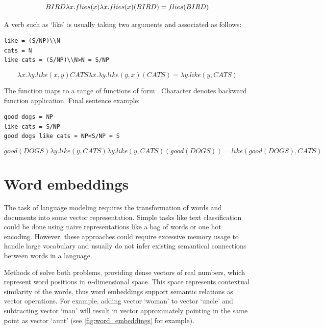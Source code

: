 \[ 
BIRD \\
\lambda x.flies(x)\\
\lambda x.flies(x)(BIRD)=flies(BIRD)
\]

A verb such as ‘like’ is usually taking two arguments and associated as follows:

\begin{verbatim}
like = (S/NP)\\N
cats = N
like cats = (S/NP)\\N>N = S/NP
\end{verbatim}

\[ 
\lambda x.\lambda y.like(x, y)
CATS
\lambda x.\lambda y.like(y, x)(CATS)=\lambda y.like(y, CATS)
\]

The function  maps  to a range of functions of form .  Character \code{<} denotes backward function application. Final sentence example:

\begin{verbatim}
good dogs = NP
like cats = S/NP
good dogs like cats = NP<S/NP = S
\end{verbatim}

\[ 
good(DOGS) 
\lambda y.like(y, CATS)
\lambda y.like(y, CATS)(good(DOGS))=like(good(DOGS), CATS)
\]

\section{Word embeddings}
The task of language modeling requires the transformation of words and documents into some vector representation. Simple tasks like text classification could be done using naive representations like a bag of words or one hot encoding. However, these approaches could require excessive memory usage to handle large vocabulary and usually do not infer existing semantical connections between words in a language. 

Methods of  solve both problems, providing dense vectors of real numbers, which represent word positions in $n$-dimensional space. This space represents contextual similarity of the words, thus word embeddings support semantic relations as vector operations. For example, adding vector ‘woman’ to vector ‘uncle’ and subtracting vector ‘man’ will result in vector approximately pointing in the same point as vector ‘aunt’ (see \ref{fig:word_embeddings} for example).

